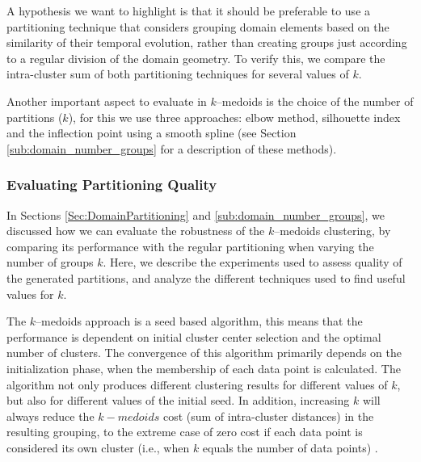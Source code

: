 A hypothesis we want to highlight is that it should be preferable to use a partitioning technique that considers grouping domain elements based on the similarity of their temporal evolution, rather than creating groups just according to a regular division of the domain geometry. To verify this, we compare the intra-cluster sum of both partitioning techniques for several values of $k$.

Another important aspect to evaluate in $k$--medoids is the choice of the number of partitions ($k$), for this we use three approaches: elbow method, silhouette index and the inflection point using a smooth spline (see Section \ref{sub:domain_number_groups} for a description of these methods).

\subsubsection{Evaluating Partitioning Quality}
\label{Sec:EvaluatingPP}

In Sections \ref{Sec:DomainPartitioning} and \ref{sub:domain_number_groups}, we discussed how we can evaluate the robustness of the $k$--medoids clustering, by comparing its performance with the regular partitioning when varying the number of groups $k$. Here, we describe the experiments used to assess quality of the generated partitions, and analyze the different techniques used to find useful values for $k$.  %

The $k$--medoids approach is a seed based algorithm, this means that the performance is dependent on initial cluster center selection and the optimal number of clusters. The convergence of this algorithm primarily depends on the initialization phase, when the membership of each data point is calculated. The algorithm not only produces different clustering results for different values of $k$, but also for different values of the initial seed. In addition, increasing $k$ will always reduce the $k-medoids$ cost (sum of intra-cluster distances) in the resulting grouping, to the extreme case of zero cost if each data point is considered its own cluster (i.e., when $k$ equals the number of data points) \cite{HastieTF2009}. 

